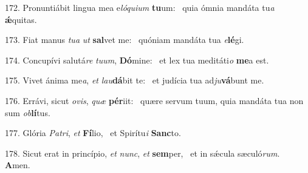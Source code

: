 172. Pronuntiábit lingua mea e\textit{ló}\textit{qui}\textit{um} \textbf{tu}um: \ast\  quia ómnia mandáta tu\textit{a} \textbf{ǽ}quitas.\

173. Fiat manus \textit{tu}\textit{a} \textit{ut} \textbf{sal}vet me: \ast\  quóniam mandáta tua \textit{e}\textbf{lé}gi.\

174. Concupívi salutá\textit{re} \textit{tu}\textit{um}, \textbf{Dó}mine: \ast\  et lex tua meditáti\textit{o} \textbf{me}a est.\

175. Vivet ánima me\textit{a}, \textit{et} \textit{lau}\textbf{dá}bit te: \ast\  et judícia tua ad\textit{ju}\textbf{vá}bunt me.\

176. Errávi, sicut \textit{o}\textit{vis}, \textit{quæ} \textbf{pér}iit: \ast\  quære servum tuum, quia mandáta tua non sum \textit{ob}\textbf{lí}tus.\

177. Glória \textit{Pa}\textit{tri}, \textit{et} \textbf{Fí}lio, \ast\  et Spirítu\textit{i} \textbf{Sanc}to.\

178. Sicut erat in princípio, \textit{et} \textit{nunc}, \textit{et} \textbf{sem}per, \ast\  et in sǽcula sæculó\textit{rum}. \textbf{A}men.\

